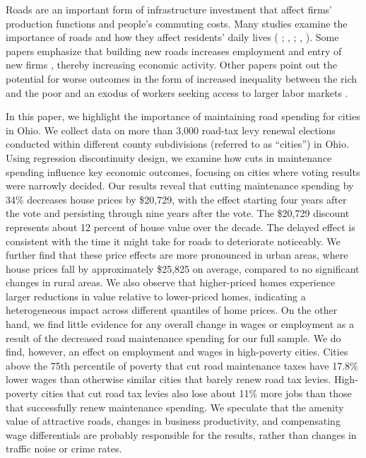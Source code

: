 
Roads are an important form of infrastructure investment that affect firms’ production functions and people’s commuting costs. Many studies examine the importance of roads and how they affect residents' daily lives ( \citeyear{currier2023};  \citeyear{adukia2020},  \citeyear{banerjee2020};  \citeyear{banerjee2020},  \citeyear{banerjee2020}). Some papers emphasize that building new roads increases employment and entry of new firms \citep{gibbons2019new}, thereby increasing economic activity. Other papers point out the potential for worse outcomes in the form of increased inequality between the rich and the poor \citep{hettige2006} and an exodus of workers seeking access to larger labor markets \citep{asher2020}.  
 
In this paper, we highlight the importance of maintaining road spending for cities in Ohio. We collect data on more than 3,000 road-tax levy renewal elections conducted within different county subdivisions (referred to as “cities”)  in Ohio. Using regression discontinuity design, we examine how cuts in maintenance spending influence key economic outcomes, focusing on cities where voting results were narrowly decided. Our results reveal that cutting maintenance spending by 34\% decreases house prices by \$20,729, with the effect starting four years after the vote and persisting through nine years after the vote. The \$20,729 discount represents about 12 percent of house value over the decade.  The delayed effect is consistent with the time it might take for roads to deteriorate noticeably.  We further find that these price effects are more pronounced in urban areas, where house prices fall by approximately \$25,825 on average, compared to no significant changes in rural areas. We also observe that higher-priced homes experience larger reductions in value relative to lower-priced homes, indicating a heterogeneous impact across different quantiles of home prices. On the other hand, we find little evidence for any overall change in wages or employment as a result of the decreased road maintenance spending for our full sample.  We do find, however, an effect on employment and wages in high-poverty cities.  Cities above the 75th percentile of poverty that cut road maintenance taxes have 17.8\% lower wages than otherwise similar cities that barely renew road tax levies.  High-poverty cities that cut road tax levies also lose about 11\% more jobs than those that successfully renew maintenance spending.  We speculate that the amenity value of attractive roads, changes in business productivity, and compensating wage differentials are probably responsible for the results, rather than changes in traffic noise or crime rates.

